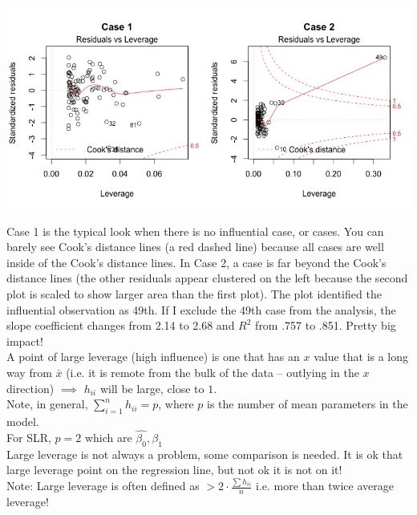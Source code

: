 \documentclass[a4paper, 11pt, twoside]{article}
\begin{document}
\includegraphics[width=\textwidth]{leverage.jpeg}

Case 1 is the typical look when there is no influential case, or cases. You can barely see Cook’s distance lines (a red dashed line) because all cases are well inside of the Cook’s distance lines. In Case 2, a case is far beyond the Cook’s distance lines (the other residuals appear clustered on the left because the second plot is scaled to show larger area than the first plot). The plot identified the influential observation as 49th. If I exclude the 49th case from the analysis, the slope coefficient changes from 2.14 to 2.68 and $R^2$ from .757 to .851. Pretty big impact!\\

A point of large leverage (high influence) is one that has an $x$ value that is a long way from $\bar{x}$ (i.e. it is remote from the bulk of the data -- outlying in the $x$ direction) $\implies$ $h_{ii}$ will be large, close to $1$.\\

Note, in general, $\sum^n_{i=1}h_{ii} = p$, where $p$ is the number of mean parameters in the model.\\

For SLR, $p=2$ which are $\hat{\beta_0}, \hat{\beta_1}$\\

Large leverage is not always a problem, some comparison is needed. It is ok that large leverage point on the regression line, but not ok it is not on it!\\

Note: Large leverage is often defined as $> 2\cdot \frac{\sum h_{ii}}{n}$ i.e. more than twice average leverage!
\end{document}
